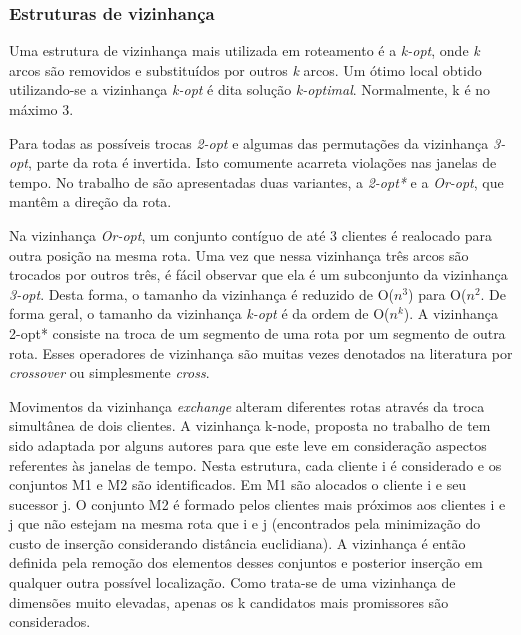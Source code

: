 \subsubsection{Estruturas de vizinhança}

Uma estrutura de vizinhança mais utilizada em roteamento é a \textit{k-opt}, onde \textit{k} arcos são removidos e substituídos por outros \textit{k} arcos. Um ótimo local obtido utilizando-se a vizinhança \textit{k-opt} é dita solução \textit{k-optimal}. Normalmente, k é no máximo 3.

Para todas as possíveis trocas \textit{2-opt} e algumas das permutações da vizinhança \textit{3-opt}, parte da rota é invertida. Isto comumente acarreta violações nas janelas de tempo. No trabalho de \cite{Potvin} são apresentadas duas variantes, a \textit{2-opt*}  e a \textit{Or-opt}, que mantêm a direção da rota.

Na vizinhança \textit{Or-opt}, um conjunto contíguo de até 3 clientes é realocado para outra posição na mesma rota. Uma vez que nessa vizinhança três arcos são trocados por outros três, é fácil observar que ela é um subconjunto da vizinhança \textit{3-opt}. Desta forma, o tamanho da vizinhança é reduzido de O(\(n^3\)) para O(\(n^2\). De forma geral, o tamanho da vizinhança \textit{k-opt}  é da ordem de O(\(n^k\)). A vizinhança 2-opt* consiste na troca de um
segmento de uma rota por um segmento de outra rota. Esses operadores de vizinhança são muitas vezes denotados na literatura por \textit{crossover} ou simplesmente \textit{cross}.

Movimentos da vizinhança \textit{exchange} alteram diferentes rotas através da troca simultânea
de dois clientes. A vizinhança k-node, proposta no trabalho de \cite{Christofides} tem sido adaptada por alguns autores para que este leve em consideração aspectos referentes às janelas de tempo. Nesta estrutura, cada cliente i é considerado e os conjuntos M1 e M2 são identificados. Em M1 são alocados o cliente i e seu sucessor j. O conjunto M2 é formado pelos clientes mais próximos aos clientes i e j que não estejam na mesma rota que i e j (encontrados pela minimização do custo de inserção considerando distância euclidiana). A vizinhança é então definida pela remoção dos elementos desses conjuntos e posterior inserção em qualquer outra possível localização. Como trata-se de uma vizinhança de dimensões muito elevadas, apenas os k candidatos mais promissores são considerados. 

